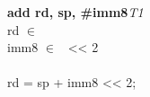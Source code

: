 


\begin{instructionblock}{\imagewidth}%
    \textbf{add rd, sp, \#imm8}\hfill\textit{T1}\\
    rd $\in$ \baseregisters\\
    imm8 $\in$ \immEight\ {<}{<} 2\\
    {}\\
    rd = sp + imm8 {<}{<} 2;
\end{instructionblock}

